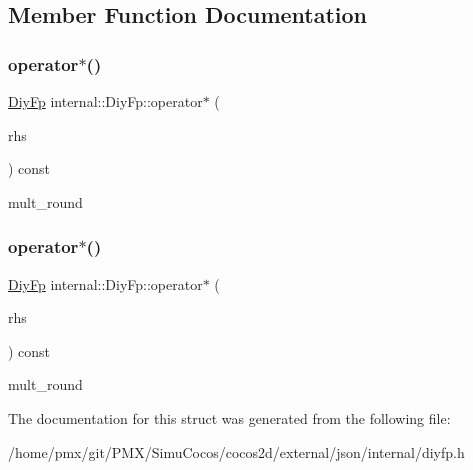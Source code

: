 \subsection{Member Function Documentation}
\mbox{\label{structinternal_1_1DiyFp_a9868841f824924cc385ad5163c9c85b3}} 
\subsubsection{\texorpdfstring{operator$\ast$()}{operator*()}\hspace{0.1cm}{\footnotesize\ttfamily [1/2]}}
{\footnotesize\ttfamily \hyperlink{structinternal_1_1DiyFp}{Diy\+Fp} internal\+::\+Diy\+Fp\+::operator$\ast$ (\begin{DoxyParamCaption}\item[{const \hyperlink{structinternal_1_1DiyFp}{Diy\+Fp} \&}]{rhs }\end{DoxyParamCaption}) const\hspace{0.3cm}{\ttfamily [inline]}}

mult\+\_\+round \mbox{\label{structinternal_1_1DiyFp_a9868841f824924cc385ad5163c9c85b3}} 
\subsubsection{\texorpdfstring{operator$\ast$()}{operator*()}\hspace{0.1cm}{\footnotesize\ttfamily [2/2]}}
{\footnotesize\ttfamily \hyperlink{structinternal_1_1DiyFp}{Diy\+Fp} internal\+::\+Diy\+Fp\+::operator$\ast$ (\begin{DoxyParamCaption}\item[{const \hyperlink{structinternal_1_1DiyFp}{Diy\+Fp} \&}]{rhs }\end{DoxyParamCaption}) const\hspace{0.3cm}{\ttfamily [inline]}}

mult\+\_\+round 

The documentation for this struct was generated from the following file\+:\begin{DoxyCompactItemize}
\item 
/home/pmx/git/\+P\+M\+X/\+Simu\+Cocos/cocos2d/external/json/internal/diyfp.\+h\end{DoxyCompactItemize}
